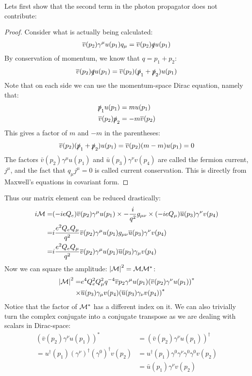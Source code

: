 Lets first show that the second term in the photon propagator does not contribute:
\begin{proof}
  Consider what is actually being calculated:
  \begin{align*}
    \overline{v}(p_2)\gamma^\mu u(p_1)q_\mu=\overline{v}(p_2)\slashed{q}u(p_1)
  \end{align*}
  By conservation of momentum, we know that $q=p_1+p_2$:
  \begin{align*}
    \overline{v}(p_2)\slashed{q}u(p_1)=\overline{v}(p_2)(\slashed{p}_1+\slashed{p}_2)u(p_1)
  \end{align*}
  Note that on each side we can use the momentum-space Dirac equation, namely that:
  \begin{align*}
    \slashed{p}_1u(p_1)&=m u(p_1)\\
    \overline{v}(p_2)\slashed{p}_2&=-m\overline{v}(p_2)
  \end{align*}
  This gives a factor of $m$ and $-m$ in the parentheses:
  \begin{align*}
    \overline{v}(p_2)(\slashed{p}_1+\slashed{p}_2)u(p_1)
    =\overline{v}(p_2)(m-m)u(p_1)=0
  \end{align*}
  The factors $\bar{v}(p_2)\gamma^\mu u(p_1)$ and $\bar{u}(p_3)\gamma^\nu v(p_4)$ are called the fermion current, $j^\mu$, and the fact that $q_\mu j^\mu=0$ is called current conservation. This is directly from Maxwell's equations in covariant form.
\end{proof}
Thus our matrix element can be reduced drastically:
\begin{align*}
  i\mathcal{M}=&(-ieQ_e)\overline{v}(p_2)\gamma^\mu u(p_1)
  \times-\frac{i}{q^2}g_{\mu\nu}
  \times(-ieQ_\mu)\overline{u}(p_3)\gamma^\nu v(p_4)\\
  =&i\frac{e^2Q_e Q_\mu}{q^2}\overline{v}(p_2)\gamma^\mu u(p_1)
  g_{\mu\nu}\overline{u}(p_3)\gamma^\nu v(p_4)\\
  =&i\frac{e^2Q_e Q_\mu}{q^2}\overline{v}(p_2)\gamma^\mu u(p_1)
  \overline{u}(p_3)\gamma_\mu v(p_4)
\end{align*}
Now we can square the amplitude: $\abs{\mathcal{M}}^2=\mathcal{M}\mathcal{M}^*$:
\begin{align*}
  \abs{\mathcal{M}}^2=&e^4Q_e^2Q_\mu^2q^{-4}\overline{v}p_2\gamma^\mu u(p_1)
  {(\overline{v}(p_2)\gamma^\nu u(p_1))}^*\\
  \times&\overline{u}(p_3)\gamma_\mu v(p_4)
  {(\overline{u}(p_3)\gamma_\nu v(p_4))}^*
\end{align*}
Notice that the factor of $\mathcal{M}^*$ has a different index on it. We can also trivially turn the complex conjugate into a conjugate transpose as we are dealing with scalars in Dirac-space:
\begin{align*}
  {(\bar{v}(p_2)\gamma^\nu u(p_1))}^*&={(\bar{v}(p_2)\gamma^\nu u(p_1))}^\dag\\
  =u^\dag(p_1){(\gamma^\nu)}^\dag{(\gamma^0)}^\dag v(p_2)
  &=u^\dag(p_1)\gamma^0\gamma^\nu\gamma^0\gamma^0 v(p_2)\\
  &=\bar{u}(p_1)\gamma^\nu v(p_2)
\end{align*}

